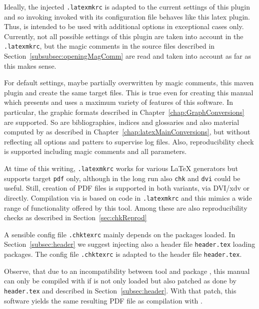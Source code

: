 Ideally, the injected \texttt{.latexmkrc} is adapted to the current settings of this plugin 
and so invoking  invoked with its configuration file 
behaves like this latex plugin. 
Thus,  is intended to be used with additional options in exceptional cases only. 
Currently, not all possible settings of this plugin 
are taken into account in the \texttt{.latexmkrc}, %
but the magic comments in the source files described in Section~\ref{subsubsec:openingMagComm} 
are read and taken into account as far as this makes sense. 

For default settings, maybe partially overwritten by magic comments, 
this maven plugin and  create the same target files. 
This is true even for creating this manual 
which presents and uses a maximum variety of features of this software. 
In particular, the graphic formats 
described in Chapter~\ref{chap:GraphConversions} are supported. 
So are bibliographies, indices and glossaries and also material computed by  
as described in Chapter~\ref{chap:latexMainConversions}, 
but without reflecting all options and patters to supervise log files. 
Also, reproducibility check is supported including magic comments and all parameters. 

At time of this writing, \texttt{.latexmkrc} works for various \LaTeX{} generators 
but supports target \texttt{pdf} only, 
although in the long run also \texttt{chk} and \texttt{dvi} could be useful. 
Still, creation of PDF files is supported in both variants, via DVI/\gls{xdv} or directly. 
Compilation via  is based on code in \texttt{.latexmkrc} 
and this mimics a wide range of functionality offered by this tool. 
Among these are also reproducibility checks 
as described in Section~\ref{sec:chkReprod}

A sensible config file \texttt{.chktexrc} mainly depends on the packages loaded. 
In Section~\ref{subsec:header} we suggest injecting also a header file \texttt{header.tex} 
loading packages. 
The config file \texttt{.chktexrc} is adapted to the header file \texttt{header.tex}. 

Observe, that due to an incompatibility between tool  and package , 
this manual can only be compiled with  
if  is not only loaded but also patched 
as done by \texttt{header.tex} and described in Section~\ref{subsec:header}. 
With that patch, this software yields the same resulting PDF file 
as compilation with . 

